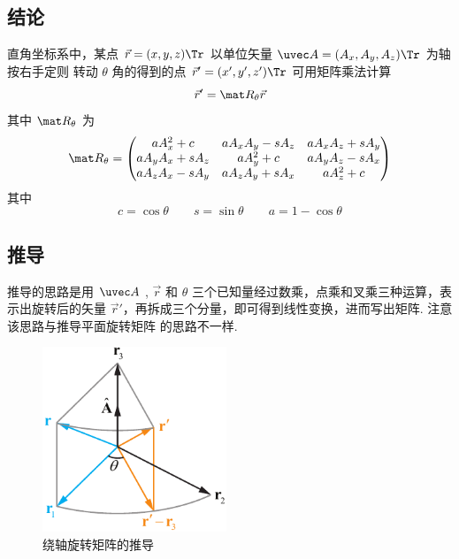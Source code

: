 
\subsection{结论}
直角坐标系中，某点 $\vec r=(x,y,z)\Tr$ 以单位矢量 $\uvec A=(A_x, A_y, A_z)\Tr$ 为轴按右手定则%
转动 $\theta$ 角的得到的点 $\vec r'=(x',y',z')\Tr$ 可用矩阵乘法计算
\begin{equation}
\vec r' = \mat R_\theta \vec r
\end{equation}
其中 $\mat R_\theta$ 为
\begin{equation}
\mat R_\theta =
\begin{pmatrix}
a A_x^2 + c & a A_x A_y - s A_z & a A_x A_z + s A_y\\
a A_y A_x + s A_z & a A_y^2 + c & a A_y A_z - s A_x\\
a A_z A_x - s A_y & a A_z A_y + s A_x & a A_z^2 + c
\end{pmatrix}\end{equation}
其中
\begin{equation}
c = \cos\theta \qquad s = \sin\theta \qquad a = 1 - \cos\theta
\end{equation}

\subsection{推导}
推导的思路是用 $\uvec A$ , $\vec r$ 和 $\theta $ 三个已知量经过数乘，点乘和叉乘三种运算，表示出旋转后的矢量 $\vec r'$，再拆成三个分量，即可得到线性变换，进而写出矩阵. 注意该思路与推导平面旋转矩阵 的思路不一样.
\begin{figure}[ht]
\centering
\includegraphics[width=5.5cm]{./figures/RotA1.pdf}
\caption{绕轴旋转矩阵的推导}
\end{figure} 

